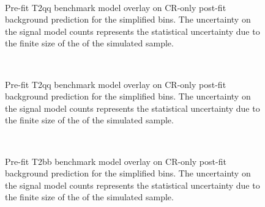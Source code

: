 \begin{figure}[h!]
    \begin{center}
         \\
        \caption{
            Pre-fit T2qq benchmark model overlay on CR-only post-fit
            background prediction for the simplified bins. The uncertainty on
            the signal model counts represents the statistical uncertainty due
            to the finite size of the of the simulated sample.
        }
        \label{fig:T2qq_1fold_MR_simp}
    \end{center}
\end{figure}

\begin{figure}[h!]
    \begin{center}
         \\
        \caption{
            Pre-fit T2qq benchmark model overlay on CR-only post-fit
            background prediction for the simplified bins. The uncertainty on
            the signal model counts represents the statistical uncertainty due
            to the finite size of the of the simulated sample.
        }
        \label{fig:T2qq_8fold_MR_simp}
    \end{center}
\end{figure}

\begin{figure}[h!]
    \begin{center}
         \\
        \caption{
            Pre-fit T2bb benchmark model overlay on CR-only post-fit
            background prediction for the simplified bins. The uncertainty on
            the signal model counts represents the statistical uncertainty due
            to the finite size of the of the simulated sample.
        }
        \label{fig:T2bb_MR_simp}
    \end{center}
\end{figure}

